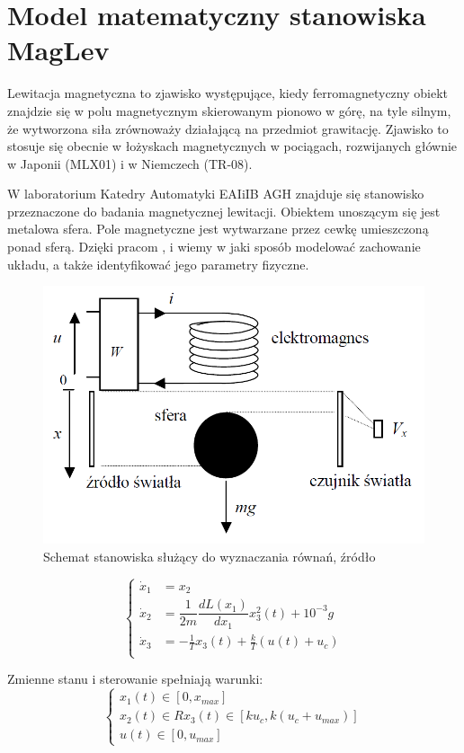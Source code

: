 \section{Model matematyczny stanowiska MagLev}

Lewitacja magnetyczna to zjawisko występujące, kiedy ferromagnetyczny obiekt znajdzie się w polu magnetycznym skierowanym pionowo w górę, na tyle silnym, że wytworzona siła zrównoważy działającą na przedmiot grawitację. Zjawisko to stosuje się obecnie w łożyskach magnetycznych w pociągach, rozwijanych głównie w Japonii (MLX01) i w Niemczech (TR-08).

W laboratorium Katedry Automatyki EAIiIB AGH znajduje się stanowisko przeznaczone do badania magnetycznej lewitacji. Obiektem unoszącym się jest metalowa sfera. Pole magnetyczne jest wytwarzane przez cewkę umieszczoną ponad sferą. Dzięki pracom \cite{Bania1999}, \cite{Bania200.} i \cite{Pilat} wiemy w jaki sposób modelować zachowanie układu, a także identyfikować jego parametry fizyczne.

\begin{figure}[!htb]
\centering
\includegraphics[scale=0.45]{img/model-rownania.PNG}
\caption{Schemat stanowiska służący do wyznaczania równań, źródło \cite{Bania200.}}
\label{rys:model-rownania}
\end{figure}

\begin{equation}\label{modelMagLev}
  \begin{cases}
    \dot x_1 & = x_2 \\
    \dot x_2 & = \dfrac{1}{2m} \dfrac{dL(x_1)}{dx_1} x_3^2(t) + 10^{-3} g  \\
    \dot x_3 & = -\frac{1}{T} x_3(t) + \frac{k}{T} (u(t) + u_c) \\
  \end{cases}  
\end{equation}

Zmienne stanu i sterowanie spełniają warunki:
\begin{equation}
\begin{cases}
x_1(t) \in [0, x_{max}] \\
x_2(t) \in R
x_3(t) \in [ku_c, k(u_c+u_{max})] \\
u(t) \in [0, u_{max}]
\end{cases}
\end{equation}



